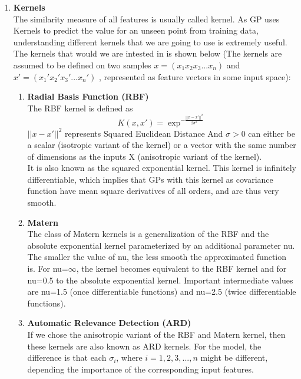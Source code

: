 \documentclass{article}
\begin{document}
\begin{enumerate}
		\item \textbf{Kernels}	\\
		The similarity measure of all features is usually called kernel. As GP uses Kernels to predict the value for an unseen point from training data, 
		understanding different kernels that we are going to use is extremely useful. \\
		The kernels that would we are intested in is shown below 
		(The kernels are assumed to be defined on two samples \( x = ( x_{1} x_{2} x_{3} ... x_{n} ) \) and 
		\( x' = ( {x_{1}}' {x_{2}}' {x_{3}}' ... {x_{n}}')\) ,  
		represented as feature vectors in some input space):
		\begin{enumerate}
			\item \textbf{Radial Basis Function (RBF)}\\
			The RBF kernel is defined as 
			\begin{equation}\label{eq:kernel_rbf}
				K(x,x') = \exp^{-\frac{||x-x'||^{2}}{2\sigma^{2}}}
			\end{equation}
			\(||x-x'||^{2}\) represents Squared Euclidean Distance 
			And \( \sigma > 0 \) can either be a scalar (isotropic variant of the kernel) or a vector with the same number of dimensions 
			as the inputs X (anisotropic variant of the kernel). \\
			It is also known as the squared exponential kernel. This kernel is infinitely differentiable, 
			which implies that GPs with this kernel as covariance function have mean square derivatives of all orders, 
			and are thus very smooth.
			
			\item \textbf{Matern}\\
			The class of Matern kernels is a generalization of the RBF and the absolute exponential kernel parameterized 
			by an additional parameter nu. The smaller the value of nu, the less smooth the approximated function is. For nu=\(\infty\), 
			the kernel becomes equivalent to the RBF kernel and for nu=0.5 to the absolute exponential kernel. 
			Important intermediate values are nu=1.5 (once differentiable functions) and nu=2.5 (twice differentiable functions).

			\item \textbf{Automatic Relevance Detection (ARD)}\\
			If we chose the anisotropic variant of the RBF and Matern kernel, then these kernels are also known as ARD kernels. For the model, the difference is that each \(\sigma_{i}\), where $i = 1,2,3,...,n$ might be different, depending the importance of the corresponding input features.\\


\end{enumerate}
\end{enumerate}
\end{document}
